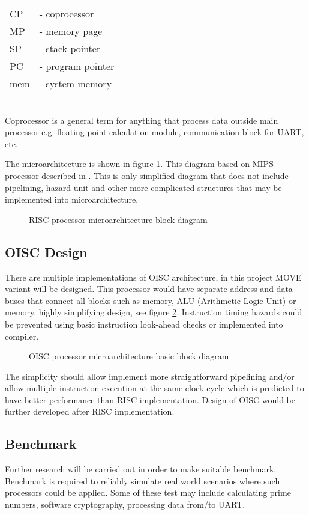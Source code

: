 \documentclass[a4paper,11pt]{article}
\begin{document}
\begin{tabular}{ll}
	CP & - coprocessor\\
	MP & - memory page \\
	SP & - stack pointer \\
	PC & - program pointer \\
	mem & - system memory \\
\end{tabular}\\
Coprocessor is a general term for anything that process data outside main processor e.g. floating point calculation module, communication block for UART, etc. 

The microarchitecture is shown in figure \ref{fig:risc_block}. This diagram based on MIPS processor described in \cite{harris}. This is only simplified diagram that does not include pipelining, hazard unit and other more complicated structures that may be implemented into microarchitecture.  
\begin{figure}[h!]
	\centering
	\def\svgwidth{16cm}
	
	\caption{RISC processor microarchitecture block diagram}
	\label{fig:risc_block}
\end{figure}

\pagebreak
\subsection{OISC Design}

There are multiple implementations of OISC architecture, in this project MOVE variant will be designed. This processor would have separate address and data buses that connect all blocks such as memory, ALU (Arithmetic Logic Unit) or memory, highly simplifying design, see figure \ref{fig:oisc_block}. Instruction timing hazards could be prevented using basic instruction look-ahead checks or implemented into compiler. 
\begin{figure}[h!]
	\centering
	\def\svgwidth{16cm}
	
	\caption{OISC processor microarchitecture basic block diagram}
	\label{fig:oisc_block}
\end{figure}
The simplicity should allow implement more straightforward pipelining and/or allow multiple instruction execution at the same clock cycle which is predicted to have better performance than RISC implementation. Design of OISC would be further developed after RISC implementation.  

\subsection{Benchmark}
Further research will be carried out in order to make suitable benchmark. Benchmark is required to reliably simulate real world scenarios where such processors could be applied. Some of these test may include calculating prime numbers, software cryptography, processing data from/to UART. 
\end{document}
